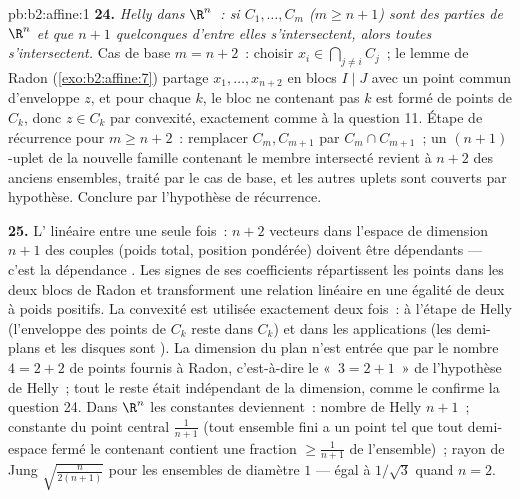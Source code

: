 \begin{solution}{pb:b2:affine:1}
\textbf{24.} \emph{Helly dans $\R^n$~: si $C_1, \dots, C_m$
($m \geq n + 1$) sont des parties  de $\R^n$ et que $n + 1$
quelconques d'entre elles s'intersectent, alors toutes s'intersectent.}
Cas de base $m = n + 2$~: choisir $x_i \in \bigcap_{j\neq i}C_j$~;
le lemme de Radon (\cref{exo:b2:affine:7}) partage $x_1, \dots,
x_{n+2}$ en blocs $I \mid J$ avec un point commun d'enveloppe $z$,
et pour chaque $k$, le bloc ne contenant pas $k$ est formé de
points de $C_k$, donc $z \in C_k$ par convexité, exactement comme à la
question 11. Étape de récurrence pour $m \geq n + 2$~: remplacer
$C_m, C_{m+1}$ par $C_m \cap C_{m+1}$~; un $(n+1)$-uplet de la
nouvelle famille contenant le membre intersecté revient à $n + 2$
des anciens ensembles, traité par le cas de base, et les autres
uplets sont couverts par hypothèse. Conclure par l'hypothèse de
récurrence.

\textbf{25.} L' linéaire entre une seule fois~: $n + 2$
vecteurs dans l'espace de dimension $n+1$ des couples (poids total,
position pondérée) doivent être dépendants --- c'est la dépendance
. Les signes de ses coefficients répartissent les points
dans les deux blocs de Radon et transforment une relation linéaire en
une égalité de deux  à poids positifs. La convexité est
utilisée exactement deux fois~: à l'étape de Helly (l'enveloppe des
points de $C_k$ reste dans $C_k$) et dans les applications (les
demi-plans et les disques sont ). La dimension du plan n'est
entrée que par le nombre $4 = 2 + 2$ de points fournis à Radon,
c'est-à-dire le «~$3 = 2 + 1$~» de l'hypothèse de Helly~; tout le
reste était indépendant de la dimension, comme le confirme la
question 24. Dans $\R^n$ les constantes deviennent~: nombre de Helly
$n + 1$~; constante du point central $\frac1{n+1}$ (tout ensemble
fini a un point tel que tout demi-espace fermé le contenant contient
une fraction $\geq \frac1{n+1}$ de l'ensemble)~; rayon de Jung
$\sqrt{\frac{n}{2(n+1)}}$ pour les ensembles de diamètre $1$ --- égal
à $1/\sqrt3$ quand $n = 2$.
\end{solution}

